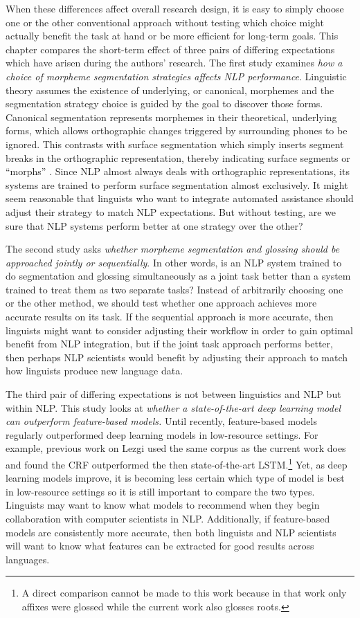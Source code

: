 When these differences affect overall research design, it is easy to simply choose one or the other conventional approach without testing which choice might actually benefit the task at hand or be more efficient for long-term goals. This chapter compares the short-term effect of three pairs of differing expectations which have arisen during the authors' research. 
The first study examines \textit{how a choice of morpheme segmentation strategies affects NLP performance}. Linguistic theory assumes the existence of underlying, or canonical, morphemes and the segmentation strategy choice is guided by the goal to discover those forms. Canonical segmentation represents morphemes in their theoretical, underlying forms, which allows orthographic changes triggered by surrounding phones to be ignored. This contrasts with surface segmentation which simply inserts segment breaks in the orthographic representation, thereby indicating surface segments or ``morphs'' \citep{virpioja_empirical_2011}. Since NLP almost always deals with orthographic representations, its systems are trained to perform surface segmentation almost exclusively. 
It might seem reasonable that linguists who want to integrate automated assistance should adjust their strategy to match NLP expectations. But without testing, are we sure that NLP systems perform better at one strategy over the other?

The second study asks \textit{whether morpheme segmentation and glossing should be approached jointly or sequentially}. In other words, is an NLP system trained to do segmentation and glossing simultaneously as a joint task better than a system trained to treat them as two separate tasks? Instead of arbitrarily choosing one or the other method, we should test whether one approach achieves more accurate results on its task. If the sequential approach is more accurate, then linguists might want to consider adjusting their workflow in order to gain optimal benefit from NLP integration, but if the joint task approach performs better, then perhaps NLP scientists would benefit by adjusting their approach to match how linguists produce new language data.

The third pair of differing expectations is not between linguistics and NLP but within NLP. This study looks at \textit{whether a state-of-the-art deep learning model can outperform feature-based models.} Until recently, feature-based models regularly outperformed deep learning models in low-resource settings. For example, previous work on Lezgi \citep{moeller_automatic_2018} used the same corpus as the current work does and found the CRF outperformed the then state-of-the-art LSTM.\footnote{A direct comparison cannot be made to this work because in that work only affixes were glossed while the current work also glosses roots.} Yet, as deep learning models improve, it is becoming less certain which type of model is best in low-resource settings so it is still important to compare the two types. Linguists may want to know what models to recommend when they begin collaboration with computer scientists in NLP. Additionally, if feature-based models are consistently more accurate, then both linguists and NLP scientists will want to know what features can be extracted for good results across languages. 

